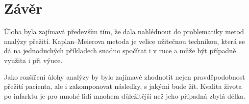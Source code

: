 \section{Závěr}

Úloha byla zajímavá především tím, že dala nahlédnout do problematiky metod analýzy přežití.
Kaplan–Meierova metoda je velice užitečnou technikou, která se dá na jednoduchých příkladech snadno spočítat i v ruce a může být případně využita i při výuce.

Jako rozšíření úlohy analýzy by bylo zajímavé zhodnotit nejen pravděpodobnost přežití pacienta, ale i zakomponovat následky, s jakými bude žít.
Kvalita života po infarktu je pro mnohé lidi mnohem důležitější než jeho případná zbylá délka.

